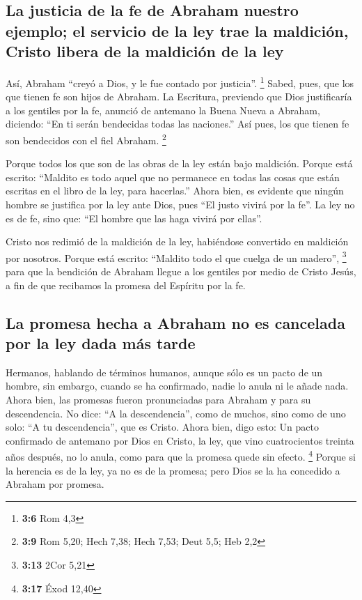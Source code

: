 \begin{paracol}{2}
\hypertarget{la-justicia-de-la-fe-de-abraham-nuestro-ejemplo-el-servicio-de-la-ley-trae-la-maldiciuxf3n-cristo-libera-de-la-maldiciuxf3n-de-la-ley}{%
\subsection{La justicia de la fe de Abraham nuestro ejemplo; el servicio
de la ley trae la maldición, Cristo libera de la maldición de la
ley}\label{la-justicia-de-la-fe-de-abraham-nuestro-ejemplo-el-servicio-de-la-ley-trae-la-maldiciuxf3n-cristo-libera-de-la-maldiciuxf3n-de-la-ley}}

 Así, Abraham ``creyó a Dios, y le fue contado por
justicia''. \footnote{\textbf{3:6} Rom 4,3}  Sabed, pues,
que los que tienen fe son hijos de Abraham.  La Escritura,
previendo que Dios justificaría a los gentiles por la fe, anunció de
antemano la Buena Nueva a Abraham, diciendo: ``En ti serán bendecidas
todas las naciones.''  Así pues, los que tienen fe son
bendecidos con el fiel Abraham. \footnote{\textbf{3:9} Rom 5,20; Hech
  7,38; Hech 7,53; Deut 5,5; Heb 2,2}

 Porque todos los que son de las obras de la ley están
bajo maldición. Porque está escrito: ``Maldito es todo aquel que no
permanece en todas las cosas que están escritas en el libro de la ley,
para hacerlas.''  Ahora bien, es evidente que ningún
hombre se justifica por la ley ante Dios, pues ``El justo vivirá por la
fe''.  La ley no es de fe, sino que: ``El hombre que las
haga vivirá por ellas''.

 Cristo nos redimió de la maldición de la ley, habiéndose
convertido en maldición por nosotros. Porque está escrito: ``Maldito
todo el que cuelga de un madero'', \footnote{\textbf{3:13} 2Cor 5,21}
 para que la bendición de Abraham llegue a los gentiles
por medio de Cristo Jesús, a fin de que recibamos la promesa del
Espíritu por la fe.

\hypertarget{la-promesa-hecha-a-abraham-no-es-cancelada-por-la-ley-dada-muxe1s-tarde}{%
\subsection{La promesa hecha a Abraham no es cancelada por la ley dada
más
tarde}\label{la-promesa-hecha-a-abraham-no-es-cancelada-por-la-ley-dada-muxe1s-tarde}}

 Hermanos, hablando de términos humanos, aunque sólo es
un pacto de un hombre, sin embargo, cuando se ha confirmado, nadie lo
anula ni le añade nada.  Ahora bien, las promesas fueron
pronunciadas para Abraham y para su descendencia. No dice: ``A la
descendencia'', como de muchos, sino como de uno solo: ``A tu
descendencia'', que es Cristo.  Ahora bien, digo esto: Un
pacto confirmado de antemano por Dios en Cristo, la ley, que vino
cuatrocientos treinta años después, no lo anula, como para que la
promesa quede sin efecto. \footnote{\textbf{3:17} Éxod 12,40}
 Porque si la herencia es de la ley, ya no es de la
promesa; pero Dios se la ha concedido a Abraham por promesa.


\end{paracol}
